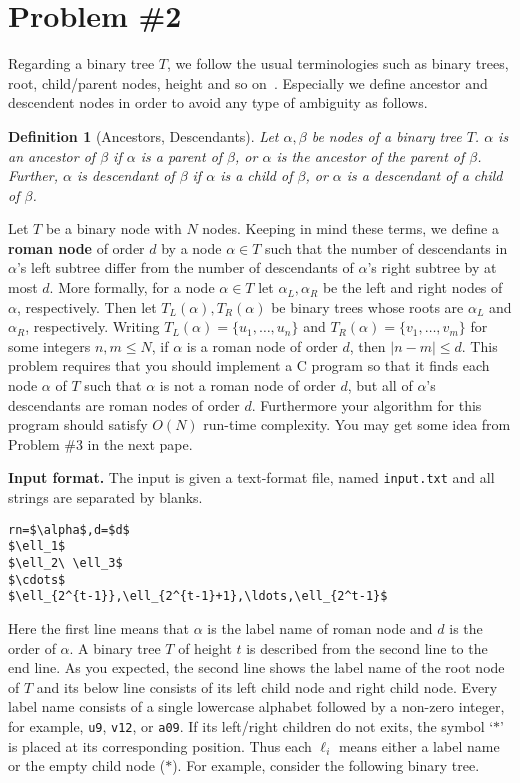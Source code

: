 \documentclass{article}
\newtheorem{df}{Definition}[section]
\begin{document}
 
\newpage
\section{Problem \#2}

Regarding a binary tree $T$, we follow the usual terminologies such as binary trees, root, child/parent nodes, height and so on~\cite[\S5.1,\S5.2]{HSAf08}.
Especially we define ancestor and descendent nodes in order to avoid any type of ambiguity as follows.
\begin{df}[Ancestors, Descendants]
Let $\alpha,\beta$ be nodes of a binary tree $T$.
$\alpha$ is an ancestor of  $\beta$ if $\alpha$ is a parent of $\beta$, or
$\alpha$ is the ancestor of the parent of $\beta$. 
Further, $\alpha$ is descendant of $\beta$ if $\alpha$ is a child of $\beta$, or
$\alpha$ is a descendant of a child of $\beta$.
\end{df}

Let $T$ be a binary node with $N$ nodes. 
Keeping in mind these terms, we define a \textbf{roman node} of order $d$ by a node $\alpha\in T$
such that the number of descendants in $\alpha$'s left subtree differ from the number of 
descendants of $\alpha$'s right subtree by at most $d$.
More formally, for a node $\alpha\in T$ let $\alpha_L,\alpha_R$ be the left and right nodes of $\alpha$, respectively.
Then let $T_L(\alpha),T_R(\alpha)$ be binary trees whose roots are $\alpha_L$ and $\alpha_R$, respectively.
Writing $T_L(\alpha)=\{u_1,\ldots,u_n\}$ and $T_R(\alpha)=\{v_1,\ldots,v_m\}$ for some integers $n,m\leq N$,
if $\alpha$ is a roman node of order $d$, then $|n-m|\leq d$.
This problem requires that you should implement a C program  so that 
it finds each node $\alpha$ of $T$ such that $\alpha$ is not a roman node of order $d$, but
all of $\alpha$'s descendants are roman nodes of order $d$. 
Furthermore your algorithm for this program should satisfy $O(N)$ run-time complexity.
You may get some idea from Problem \#3 in the next pape.
 
 
\bigskip
\noindent\textbf{Input format.} %
The input is given a text-format file, named \texttt{input.txt} and all strings are separated by blanks.
\begin{lstlisting}[backgroundcolor=\color{yellow!40}]
rn=$\alpha$,d=$d$
$\ell_1$
$\ell_2\ \ell_3$
$\cdots$
$\ell_{2^{t-1}},\ell_{2^{t-1}+1},\ldots,\ell_{2^t-1}$
\end{lstlisting}
Here the first line means that $\alpha$ is the label name of roman node and $d$ is the order of $\alpha$.
A binary tree $T$ of height $t$ is described from the second line to the end line.
As you expected, the second line shows the label name of the root node of $T$ and 
its below line consists of its left child node and right child node. 
Every label name consists of a single lowercase alphabet followed by a non-zero integer, 
for example, \texttt{u9}, \texttt{v12}, or \texttt{a09}.
If its left/right children do not exits, the symbol `$\ast$' is placed at its corresponding position.  
Thus each $\ell_i$ means either a label name or the empty child node ($\ast$).
For example, consider the following binary tree.
 
\end{document}
